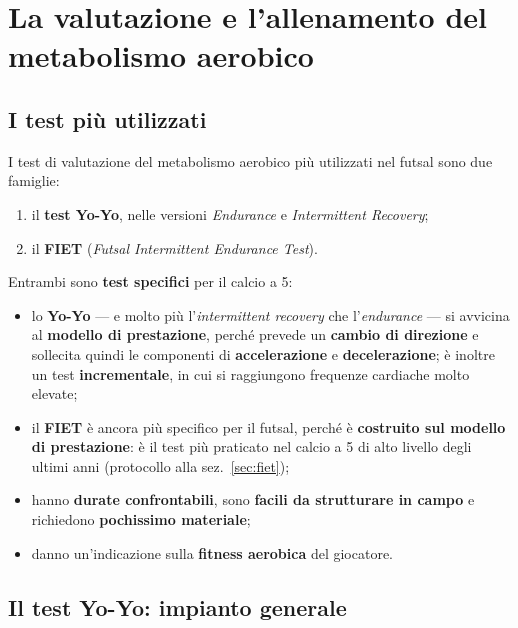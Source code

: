 \chapter{La valutazione e l'allenamento del metabolismo aerobico}
\label{cap:metabolismoaerobico}

\section{I test più utilizzati}

I test di valutazione del metabolismo aerobico più utilizzati nel futsal sono due famiglie:

\begin{enumerate}
  \item il \textbf{test Yo-Yo}, nelle versioni \textit{Endurance} e \textit{Intermittent Recovery};
  \item il \textbf{FIET} (\textit{Futsal Intermittent Endurance Test}).
\end{enumerate}

Entrambi sono \textbf{test specifici} per il calcio a 5:

\begin{itemize}
  \item lo \textbf{Yo-Yo} --- e molto più l'\textit{intermittent recovery} che l'\textit{endurance}
    --- si avvicina al \textbf{modello di prestazione}, perché prevede un \textbf{cambio di
    direzione} e sollecita quindi le componenti di \textbf{accelerazione} e \textbf{decelerazione};
    è inoltre un test \textbf{incrementale}, in cui si raggiungono frequenze cardiache molto
    elevate;
  \item il \textbf{FIET} è ancora più specifico per il futsal, perché è \textbf{costruito sul
    modello di prestazione}: è il test più praticato nel calcio a 5 di alto livello degli ultimi
    anni (protocollo alla sez.~\ref{sec:fiet});
  \item hanno \textbf{durate confrontabili}, sono \textbf{facili da strutturare in campo} e
    richiedono \textbf{pochissimo materiale};
  \item danno un'indicazione sulla \textbf{fitness aerobica} del giocatore.
\end{itemize}

\section{Il test Yo-Yo: impianto generale}

